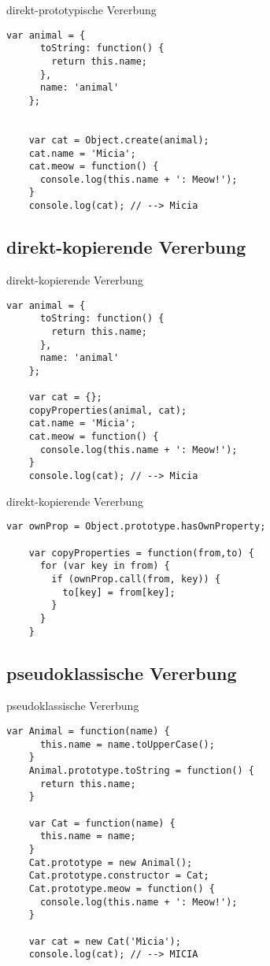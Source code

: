 \begin{frame}[fragile]{direkt-prototypische Vererbung}
  \begin{lstlisting}[gobble=4]
    var animal = {
      toString: function() {
        return this.name;
      },
      name: 'animal'
    };
    
    
    var cat = Object.create(animal);
    cat.name = 'Micia';
    cat.meow = function() {
      console.log(this.name + ': Meow!');
    }
    console.log(cat); // --> Micia
  \end{lstlisting}
\end{frame}

\subsection{direkt-kopierende Vererbung}

\begin{frame}[fragile]{direkt-kopierende Vererbung}
  \begin{lstlisting}[gobble=4]
    var animal = {
      toString: function() {
        return this.name;
      },
      name: 'animal'
    };
      
    var cat = {};
    copyProperties(animal, cat);
    cat.name = 'Micia';
    cat.meow = function() {
      console.log(this.name + ': Meow!');
    }
    console.log(cat); // --> Micia
  \end{lstlisting}
\end{frame}

\begin{frame}[fragile]{direkt-kopierende Vererbung}
  \begin{lstlisting}[gobble=4]
    var ownProp = Object.prototype.hasOwnProperty;
  
    var copyProperties = function(from,to) {
      for (var key in from) {
        if (ownProp.call(from, key)) {
          to[key] = from[key];
        }
      }
    }
  \end{lstlisting}
\end{frame}

\subsection{pseudoklassische Vererbung}

\lstset{basicstyle=\ttfamily\scriptsize}

\begin{frame}[fragile]{pseudoklassische Vererbung}
  \begin{lstlisting}[gobble=4]
    var Animal = function(name) {
      this.name = name.toUpperCase();
    }
    Animal.prototype.toString = function() {
      return this.name;
    }
    
    var Cat = function(name) {
      this.name = name;
    }
    Cat.prototype = new Animal();
    Cat.prototype.constructor = Cat;
    Cat.prototype.meow = function() {
      console.log(this.name + ': Meow!');
    }
    
    var cat = new Cat('Micia');
    console.log(cat); // --> MICIA
  \end{lstlisting}
\end{frame}

